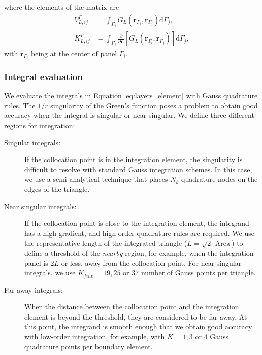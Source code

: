 %
\normalsize
where the elements of the matrix are
% 
\begin{align} \label{eq:layers_element}
V_{L,ij}^{\Gamma} &= \int_{\Gamma_j} G_L(\mathbf{r}_{\Gamma_i},\mathbf{r}_{\Gamma_j})  \mathrm{d} \Gamma_j, \nonumber \\
K_{L,ij}^{\Gamma} &= \int_{\Gamma_j} \frac{\partial}{\partial \mathbf{n}} \left[ G_L(\mathbf{r}_{\Gamma_i},\mathbf{r}_{\Gamma_j}) \right]\mathrm{d} \Gamma_j,
\end{align}
%
with $\mathbf{r}_{\Gamma_i}$ being at the center of panel $\Gamma_i$.

\subsubsection{Integral evaluation}

We evaluate the integrals in Equation \eqref{eq:layers_element} with Gauss quadrature
rules. The $1/r$ singularity of the Green's function poses a
problem to obtain good accuracy when the integral is 
singular or near-singular. We define three different regions for integration:

\begin{description}
\item[Singular integrals:] If the collocation point is in the integration element,
the singularity is difficult to resolve with standard
Gauss integration schemes. In this case, we use a semi-analytical technique 
\cite{HessSmith1967,ZhuHuangSongWhite2001} that places $N_k$ quadrature nodes on the 
edges of the triangle.

\item[Near singular integrals:] If the collocation point is close to the integration element,
the integrand has a high gradient, and high-order quadrature rules are required. 
We use the representative length of the integrated triangle ($L = \sqrt{2\cdot\text{Area}}$)
to define a threshold of the \emph{nearby} region, for example, when the integration panel 
is $2L$ or less, away from the collocation point. For near-singular integrals, we use  
$K_{fine}=19, 25  \text{ or }  37$ number of Gauss points per triangle. 

\item[Far away integrals:] When the distance between the collocation point and the integration
element is beyond the threshold, they are considered to be far away. 
At this point, the integrand is smooth enough that we obtain good 
accuracy with low-order integration, for example, with 
$K=1, 3  \text{ or } 4$ Gauss quadrature points per boundary element. 
\end{description}

